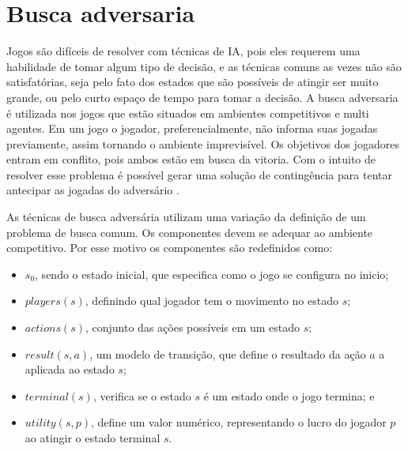 \section{Busca adversaria}

Jogos são difíceis de resolver com técnicas de IA, pois eles requerem uma habilidade de tomar algum tipo de decisão, e as técnicas comuns as vezes não são satisfatórias, seja pelo fato dos estados que são possíveis de atingir ser muito grande, ou pelo curto espaço de tempo para tomar a decisão.
A busca adversaria é utilizada nos jogos que estão situados em ambientes competitivos e multi agentes. Em um jogo o jogador, preferencialmente, não informa suas jogadas previamente, assim tornando o ambiente imprevisível. Os objetivos dos jogadores entram em conflito, pois ambos estão em busca da vitoria. 
Com o intuito de resolver esse problema é possível gerar uma solução de contingência para tentar antecipar as jogadas do adversário  \cite{intelligence2003modern}. 

As técnicas de busca adversária utilizam uma variação da definição de um problema de busca comum. Os componentes devem se adequar ao ambiente competitivo. Por esse motivo os componentes são redefinidos como:


\begin{itemize}
	\item $s_{0}$, sendo o estado inicial, que especifica como o jogo se configura no inicio;
	\item $players(s)$, definindo qual jogador tem o movimento no estado $s$;
	\item $actions(s)$, conjunto das ações possíveis em um estado $s$;
	\item $result(s, a)$, um modelo de transição, que define o resultado da ação $a$ a aplicada ao estado $s$;
	\item $terminal(s)$, verifica se o estado $s$ é um estado onde o jogo termina; e
	\item $utility(s,p)$, define um valor numérico, representando o lucro do jogador $p$ ao atingir o estado terminal $s$.
\end{itemize}

